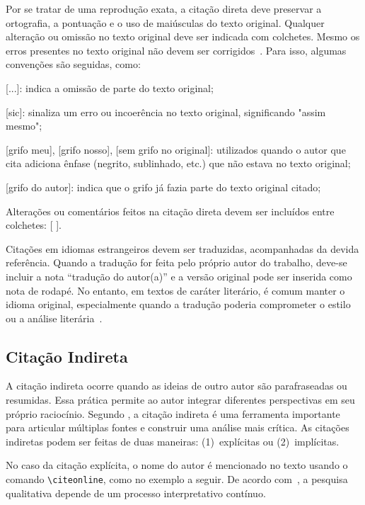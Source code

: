 Por se tratar de uma reprodução exata, a citação direta deve preservar a ortografia, a pontuação e o uso de maiúsculas do texto original. Qualquer alteração ou omissão no texto original deve ser indicada com colchetes. Mesmo os erros presentes no texto original não devem ser corrigidos~\cite{utp_normas2024}. Para isso, algumas convenções são seguidas, como:

\begin{alineas}
    \item {[...]}: indica a omissão de parte do texto original;
    \item {[sic]}: sinaliza um erro ou incoerência no texto original, significando "assim mesmo";
    \item {[grifo meu]}, [grifo nosso], [sem grifo no original]: utilizados quando o autor que cita adiciona ênfase (negrito, sublinhado, etc.) que não estava no texto original;
    \item {[grifo do autor]}: indica que o grifo já fazia parte do texto original citado;
    \item Alterações ou comentários feitos na citação direta devem ser incluídos entre colchetes: [ ].
\end{alineas}

Citações em idiomas estrangeiros devem ser traduzidas, acompanhadas da devida referência. Quando a tradução for feita pelo próprio autor do trabalho, deve-se incluir a nota ``tradução do autor(a)'' e a versão original pode ser inserida como nota de rodapé. No entanto, em textos de caráter literário, é comum manter o idioma original, especialmente quando a tradução poderia comprometer o estilo ou a análise literária~\cite{leite, utp_normas2024}.

\subsection{Citação Indireta}

A citação indireta ocorre quando as ideias de outro autor são parafraseadas ou resumidas. Essa prática permite ao autor integrar diferentes perspectivas em seu próprio raciocínio. Segundo , a citação indireta é uma ferramenta importante para articular múltiplas fontes e construir uma análise mais crítica. As citações indiretas podem ser feitas de duas maneiras: (1)~explícitas ou (2)~implícitas.

No caso da citação explícita, o nome do autor é mencionado no texto usando o comando \texttt{\textbackslash citeonline}, como no exemplo a seguir. De acordo com~, a pesquisa qualitativa depende de um processo interpretativo contínuo.

